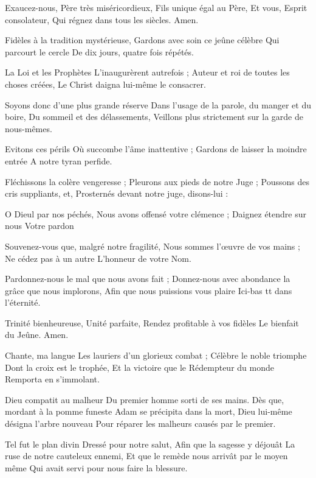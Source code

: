 \documentclass[psautier_nocturne_fr.tex]{subfiles}
\begin{document}
Exaucez-nous, Père très miséricordieux,
Fils unique égal au Père,
Et vous, Esprit consolateur,
Qui régnez dans tous les siècles.
Amen.


Fidèles à la tradition mystérieuse,
Gardons avec soin ce jeûne célèbre
Qui parcourt le cercle
De dix jours, quatre fois répétés.

La Loi et les Prophètes
L'inaugurèrent autrefois ;
Auteur et roi de toutes les choses créées,
Le Christ daigna lui-même le consacrer.

Soyons donc d'une plus grande réserve
Dans l'usage de la parole, du manger et du boire,
Du sommeil et des délassements,
Veillons plus strictement sur la garde de nous-mêmes.

Evitons ces périls
Où succombe l'âme inattentive ;
Gardons de laisser la moindre entrée
A notre tyran perfide.

Fléchissons la colère vengeresse ;
Pleurons aux pieds de notre Juge ;
Poussons des cris suppliants, et,
Prosternés devant notre juge, disons-lui :

O Dieul par nos péchés,
Nous avons offensé votre clémence ;
Daignez étendre sur nous
Votre pardon

Souvenez-vous que, malgré notre fragilité,
Nous sommes l'œuvre de vos mains ;
Ne cédez pas à un autre
L'honneur de votre Nom.

Pardonnez-nous le mal que nous avons fait ;
Donnez-nous avec abondance la grâce que nous implorons,
Afin que nous puissions vous plaire
Ici-bas tt dans l'éternité.

Trinité bienheureuse,
Unité parfaite,
Rendez profitable à vos fidèles
Le bienfait du Jeûne.
Amen.


Chante, ma langue
Les lauriers d'un glorieux combat ;
Célèbre le noble triomphe
Dont la croix est le trophée,
Et la victoire que le Rédempteur du monde
Remporta en s'immolant.

Dieu compatit au malheur
Du premier homme sorti de ses mains.
Dès que, mordant à la pomme funeste
Adam se précipita dans la mort,
Dieu lui-même désigna l'arbre nouveau
Pour réparer les malheurs causés par le premier.

Tel fut le plan divin
Dressé pour notre salut,
Afin que la sagesse y déjouât
La ruse de notre cauteleux ennemi,
Et que le remède nous arrivât par le moyen même
Qui avait servi pour nous faire la blessure.
\end{document}
